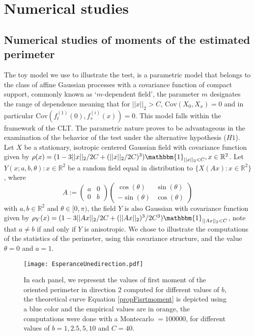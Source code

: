 \documentclass[12pt]{article}
\theoremstyle{Theorem}
\theoremstyle{definition}
\newcounter{Ax}
\begin{document}
\section{Numerical studies}
\subsection{Numerical studies of moments of the estimated perimeter}
The toy model we use to illustrate the test, is a parametric model that belongs to the class of affine Gaussian processes with a covariance function of compact support, commonly known as `$m$-dependent field', the parameter $m$ designates the range of dependence meaning that for $||x||_{2} > C$, $\text{Cov}\left(X_{0}, X_{x}\right) = 0$ and in particular $\text{Cov}\left(f_{t}^{\scriptscriptstyle (1)}(0), f_{s}^{\scriptscriptstyle (i)}(x)\right) = 0$. This model falls within the framework of the CLT. The parametric nature proves to be advantageous in the examination of the behavior of the test under the alternative hypothesis ($H1$). 
Let $X$ be a stationary, isotropic centered Gaussian field with covariance function given by $\rho(x) = (1 -3||x||_{2}/2C + (||x||_{2}/2C)^{3})\mathbbm{1}_{||x||_{2} < C}, x \in \mathbb{R}^2$.
Let ${Y(x; a, b, \theta): x \in \mathbb{R}^{2}}$ be a random field equal in distribution to  $\{X(Ax): x\in \mathbb{R}^{2}\}$, where 
\begin{equation}
A:= \begin{pmatrix} a & 0 \\ 0 & b\end{pmatrix} \begin{pmatrix} \cos(\theta) & \sin(\theta) \\ -\sin(\theta) & \cos(\theta)\end{pmatrix} 
\end{equation}
with $a, b \in \mathbb{R}^{2}$ and $\theta \in [0, \pi)$, the field $Y$ is also Gaussian with covariance function given by  $\rho_{Y}(x) = (1 - 3||Ax||_{2}/2C + (||Ax||_{2})^{3}/2C^{3})\mathbbm{1}_{||Ax||_{2} < C}$, note that $a\neq b$ if and only if $Y$ is anisotropic. We chose to illustrate the computations of the statistics of the perimeter, using this covariance structure, and the value $\theta = 0$ and $a = 1$. 
\begin{figure}[H]
  \centering
    {\texttt{[image: EsperanceUnedirection.pdf]}}
    \hspace{0.2cm}
 \caption{In each panel, we represent the values of first moment of the oriented perimeter in direction $2$ computed for different values of $b$, the theoretical curve Equation \eqref{propFisrtmoment} is depicted using a blue color and the empirical values are in orange, the computations were done with a Montecarlo $= 100000$, for different values of $b = 1, 2.5, 5, 10$ and $C = 40$. }
\end{figure}
\end{document}

